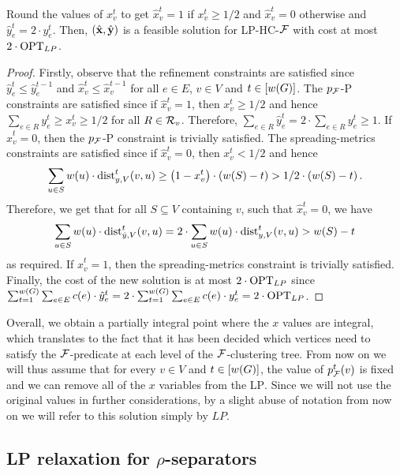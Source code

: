     \begin{lemma}\label{lem:lp-rounding}
        Round the values of $x_v^t$ to get $\hat{x}_v^t = 1$ if $x_v^t \geq 1/2$ and $\hat{x}_v^t = 0$ otherwise
        and $\hat{y}_{e}^t=2\cdot y_{e}^t$. Then, $\mathopen{}\left( \hat{\mathbf{x}}, \hat{\mathbf{y}} \right)$ is a feasible solution for \textsc{LP-HC-$\mathcal{F}$} with cost at most $2\cdot \text{OPT}_{LP}$.
    \end{lemma}
    \begin{proof}
        Firstly, observe that the refinement constraints are satisfied since $\hat{y}_{e}^t \leq \hat{y}_{e}^{t-1}$ and $\hat{x}_v^t \leq \hat{x}_v^{t-1}$ for all $e\in E$, $v\in V$ and $t\in [w\mathopen{}\left( G \right)]$. The $p_{\mathcal{F}}$-P constraints are satisfied since if $\hat{x}_v^t=1$, then $x_v^t\geq 1/2$ and hence $\sum_{e\in R} y_{e}^t \geq x_v^t \geq 1/2$ for all $R\in \mathcal{R}_v$. Therefore, $\sum_{e\in R} \hat{y}_{e}^t = 2\cdot \sum_{e\in R} y_{e}^t \geq 1$. If $\hat{x}_v^t=0$, then the $p_{\mathcal{F}}$-P constraint is trivially satisfied. The spreading-metrics constraints are satisfied since if $\hat{x}_v^t=0$, then $x_v^t<1/2$ and hence
        \[
            \sum_{u\in S} w(u)\cdot \text{dist}_{y,V}^{t}(v,u) \geq \mathopen{}\left( 1-x_v^t \right)\cdot \mathopen{}\left( w\mathopen{}\left( S \right)-t \right) > 1/2\cdot \mathopen{}\left( w\mathopen{}\left( S \right)-t \right).
        \]
        Therefore, we get that for all $S\subseteq V$ containing $v$, such that $\hat{x}_v^t=0$, we have
        \[
            \sum_{u\in S} w(u)\cdot \text{dist}_{\hat{y},V}^{t}(v,u) = 2\cdot \sum_{u\in S} w(u)\cdot \text{dist}_{y,V}^{t}(v,u) > w\mathopen{}\left( S \right)-t
        \]
        as required.
        If $\hat{x}_v^t=1$, then the spreading-metrics constraint is trivially satisfied.
        Finally, the cost of the new solution is at most $2\cdot \text{OPT}_{LP}$ since $\sum_{t=1}^{w\mathopen{}\left( G \right)} \sum_{e\in E} c(e) \cdot \hat{y}_{e}^t = 2\cdot \sum_{t=1}^{w\mathopen{}\left( G \right)} \sum_{e\in E} c(e) \cdot y_{e}^t = 2\cdot \text{OPT}_{LP}$.
    \end{proof}

    Overall, we obtain a partially integral point where the $x$ values are integral, which translates to the fact that it has been decided which vertices need to satisfy the $\mathcal{F}$-predicate at each level of the $\mathcal{F}$-clustering tree. From now on we will thus assume that for every $v\in V$ and $t\in[w\mathopen{}\left( G \right)]$, the value of $p_{\mathcal{F}}^t\mathopen{}\left( v \right)$ is fixed and we can remove all of the $x$ variables from the \textsc{LP}. Since we will not use the original values in further considerations, by a slight abuse of notation from now on we will refer to this solution simply by $LP$.

\subsection{LP relaxation for $\rho$-separators}\label{sec:lp-rho-sep}

